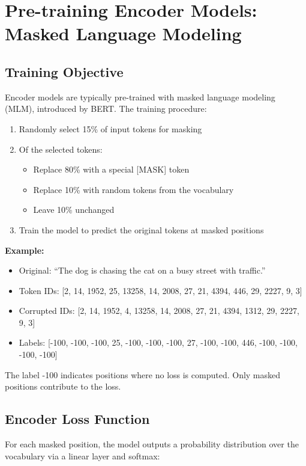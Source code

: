 \documentclass{book}
\begin{document}
\section{Pre-training Encoder Models: Masked Language Modeling}

\subsection{Training Objective}

Encoder models are typically pre-trained with masked language modeling (MLM), introduced by BERT. The training procedure:

\begin{enumerate}
\item Randomly select 15\% of input tokens for masking
\item Of the selected tokens:
   \begin{itemize}
   \item Replace 80\% with a special [MASK] token
   \item Replace 10\% with random tokens from the vocabulary
   \item Leave 10\% unchanged
   \end{itemize}
\item Train the model to predict the original tokens at masked positions
\end{enumerate}

\textbf{Example:} 
\begin{itemize}
\item Original: ``The dog is chasing the cat on a busy street with traffic.''
\item Token IDs: [2, 14, 1952, 25, 13258, 14, 2008, 27, 21, 4394, 446, 29, 2227, 9, 3]
\item Corrupted IDs: [2, 14, 1952, 4, 13258, 14, 2008, 27, 21, 4394, 1312, 29, 2227, 9, 3]
\item Labels: [-100, -100, -100, 25, -100, -100, -100, 27, -100, -100, 446, -100, -100, -100, -100]
\end{itemize}

The label -100 indicates positions where no loss is computed. Only masked positions contribute to the loss.

\subsection{Encoder Loss Function}
\label{sec:encoder-loss-function}

For each masked position, the model outputs a probability distribution over the
vocabulary via a linear layer and softmax:
\end{document}
